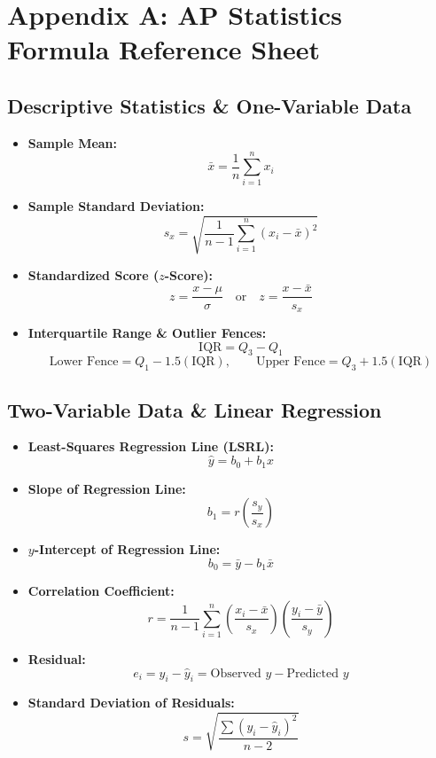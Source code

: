 \chapter{Appendix A: AP Statistics Formula Reference Sheet}

\section{Descriptive Statistics \& One-Variable Data}
\begin{itemize}[leftmargin=1.5em]
  \item \textbf{Sample Mean:}
  \[ \bar{x} = \frac{1}{n} \sum_{i=1}^n x_i \]
  \item \textbf{Sample Standard Deviation:}
  \[ s_x = \sqrt{\frac{1}{n - 1} \sum_{i=1}^n (x_i - \bar{x})^2} \]
  \item \textbf{Standardized Score ($z$-Score):}
  \[ z = \frac{x - \mu}{\sigma} \quad \text{or} \quad z = \frac{x - \bar{x}}{s_x} \]
  \item \textbf{Interquartile Range \& Outlier Fences:}
  \[ \text{IQR} = Q_3 - Q_1 \]
  \[ \text{Lower Fence} = Q_1 - 1.5(\text{IQR}), \qquad \text{Upper Fence} = Q_3 + 1.5(\text{IQR}) \]
\end{itemize}

\section{Two-Variable Data \& Linear Regression}
\begin{itemize}[leftmargin=1.5em]
  \item \textbf{Least-Squares Regression Line (LSRL):}
  \[ \hat{y} = b_0 + b_1 x \]
  \item \textbf{Slope of Regression Line:}
  \[ b_1 = r \left(\frac{s_y}{s_x}\right) \]
  \item \textbf{$y$-Intercept of Regression Line:}
  \[ b_0 = \bar{y} - b_1 \bar{x} \]
  \item \textbf{Correlation Coefficient:}
  \[ r = \frac{1}{n - 1} \sum_{i=1}^n \left(\frac{x_i - \bar{x}}{s_x}\right)\left(\frac{y_i - \bar{y}}{s_y}\right) \]
  \item \textbf{Residual:}
  \[ e_i = y_i - \hat{y}_i = \text{Observed } y - \text{Predicted } y \]
  \item \textbf{Standard Deviation of Residuals:}
  \[ s = \sqrt{\frac{\sum (y_i - \hat{y}_i)^2}{n - 2}} \]
\end{itemize}


